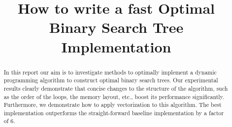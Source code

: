 \documentclass[letterpaper]{article}
\title{How to write a fast Optimal Binary Search Tree Implementation}
\begin{document}
%
\maketitle
%

\begin{abstract}
In this report our aim is to investigate methods to optimally implement a
dynamic programming algorithm to construct optimal binary search trees. Our
experimental results clearly demonstrate that concise changes to the structure
of the algorithm, such as the order of the loops, the memory layout, etc., boost
its performance significantly. Furthermore, we demonstrate how to apply
vectorization to this algorithm. The best implementation outperforms the
straight-forward baseline implementation by a factor of 6.
\end{abstract}











\end{document}
